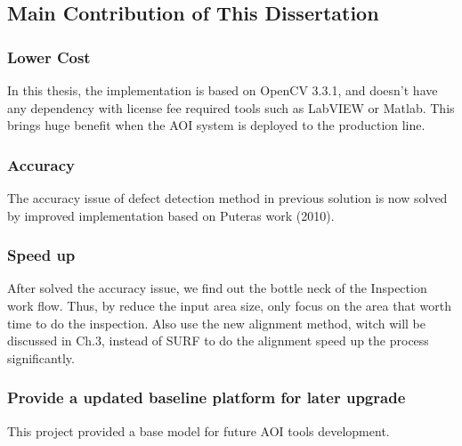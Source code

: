 	\subsection{Main Contribution of This Dissertation}
	\label{subsec:advantages}
		\subsubsection{Lower Cost}
			In this thesis, the implementation is based on OpenCV 3.3.1, and doesn't have any dependency with license fee required tools such as LabVIEW or Matlab.
			This brings huge benefit when the AOI system is deployed to the production line.

		\subsubsection{Accuracy}
			The accuracy issue of defect detection method in previous solution is now solved by improved implementation based on Puteras work\cite{putera2010printed} (2010).

		\subsubsection{Speed up}
			After solved the accuracy issue, we find out the bottle neck of the Inspection work flow. Thus, by reduce the input area size, only focus on the area that worth time to do the inspection.
			Also use the new alignment method, witch will be discussed in Ch.3, instead of SURF to do the alignment speed up the process significantly.

		\subsubsection{Provide a updated baseline platform for later upgrade}
			This project provided a base model for future AOI tools development.

